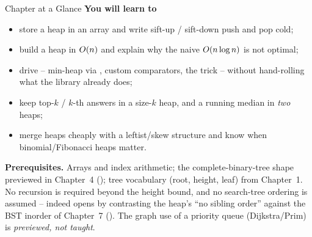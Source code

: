 \begin{chaptertheorybox}{Chapter at a Glance}
\textbf{You will learn to}
\begin{itemize}[nosep]
  \item store a heap in an array and write sift-up / sift-down push and pop cold; \hfill{}
  \item build a heap in $O(n)$ and explain why the naive $O(n\log n)$ is not optimal; \hfill{}
  \item drive  -- min-heap via , custom comparators, the
         trick -- without hand-rolling what the library already does; \hfill{}
  \item keep top-$k$ / $k$-th answers in a size-$k$ heap, and a running median in \emph{two} heaps; \hfill{}
  \item merge heaps cheaply with a leftist/skew structure and know when binomial/Fibonacci heaps matter. \hfill{}
\end{itemize}

\textbf{Prerequisites.} Arrays and index arithmetic; the complete-binary-tree shape previewed in
Chapter~4 (); tree vocabulary (root, height, leaf) from Chapter~1. No recursion is required
beyond the height bound, and no search-tree ordering is assumed -- indeed  opens by
contrasting the heap's ``no sibling order'' against the BST inorder of Chapter~7 (). The
graph use of a priority queue (Dijkstra/Prim) is \emph{previewed, not taught}.
\end{chaptertheorybox}

